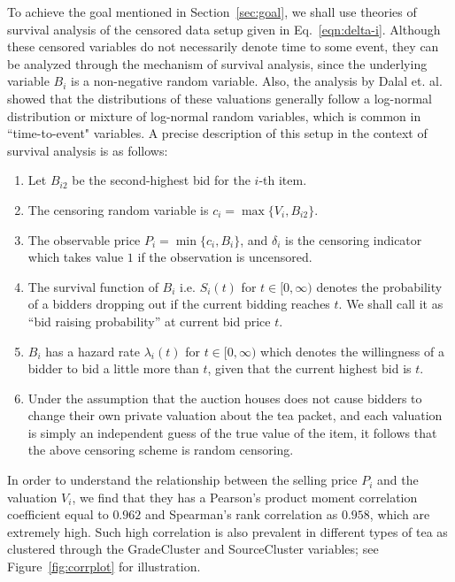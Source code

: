 \documentclass[a4paper,12pt]{article}
\begin{document}
To achieve the goal mentioned in Section~\ref{sec:goal}, we shall use theories of survival analysis of the censored data setup given in Eq.~\eqref{eqn:delta-i}. Although these censored variables do not necessarily denote time to some event, they can be analyzed through the mechanism of survival analysis, since the underlying variable $B_i$ is a non-negative random variable. Also, the analysis by Dalal et. al.~\cite{dalal2020information} showed that the distributions of these valuations generally follow a log-normal distribution or mixture of log-normal random variables, which is common in ``time-to-event" variables. A precise description of this setup in the context of survival analysis is as follows:

\begin{enumerate}
    \item Let $B_{i2}$ be the second-highest bid for the $i$-th item. 
    \item The censoring random variable is $c_i = \max\{ V_i, B_{i2} \}$.
    \item The observable price $P_i = \min\{ c_i, B_i \}$, and $\delta_i$ is the censoring indicator which takes value $1$ if the observation is uncensored.
    \item The survival function of $B_i$ i.e. $S_i(t)$ for $t \in [0,\infty)$ denotes the probability of a bidders dropping out if the current bidding reaches $t$. We shall call it as ``bid raising probability'' at current bid price $t$.
    \item $B_i$ has a hazard rate $\lambda_i(t)$ for $t \in [0, \infty)$ which denotes the willingness of a bidder to bid a little more than $t$, given that the current highest bid is $t$.
    \item Under the assumption that the auction houses does not cause bidders to change their own private valuation about the tea packet, and each valuation is simply an independent guess of the true value of the item, it follows that the above censoring scheme is random censoring.
\end{enumerate}

In order to understand the relationship between the selling price $P_i$ and the valuation $V_i$, we find that they has a Pearson's product moment correlation coefficient equal to $0.962$ and Spearman's rank correlation as $0.958$, which are extremely high. Such high correlation is also prevalent in different types of tea as clustered through the GradeCluster and SourceCluster variables; see Figure~\ref{fig:corrplot} for illustration. 
\end{document}

